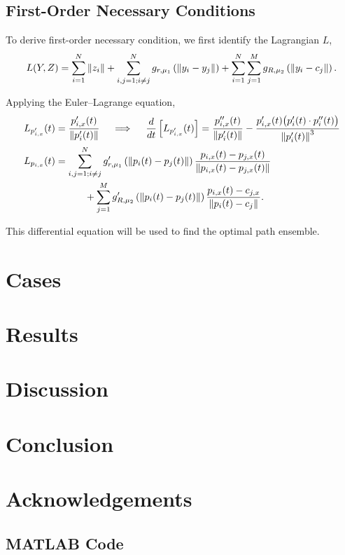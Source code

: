 \documentclass[11pt]{article}
\begin{document}
\subsection{First-Order Necessary Conditions}

To derive first-order necessary condition, we first identify the Lagrangian \(L\),
\begin{equation}
	L(Y,Z) = \sum_{i=1}^{N} \left\lVert z_i \right\rVert + \sum_{i,j = 1; i \neq j}^{N} g_{r,\mu_1}\left( \left\lVert y_i - y_j \right\rVert \right) + \sum_{i=1}^{N} \sum_{j=1}^{M} g_{R,\mu_2}\left( \left\lVert y_i - c_j \right\rVert \right).
\end{equation}

Applying the Euler--Lagrange equation,
\begin{align}
	&L_{p'_{i,x}}(t) = \frac{p'_{i,x}(t)}{\left\lVert p'_i(t) \right\rVert}
	\quad\implies\quad
	\frac{d}{dt}\left[ L_{p'_{i,x}}(t) \right] = \frac{p''_{i,x}(t)}{\left\lVert p'_i(t) \right\rVert} - \frac{p'_{i,x}(t) \big( p'_i(t) \cdot p''_i(t) \big)}{\left\lVert p'_i(t) \right\rVert^3} \\
	&\begin{aligned}
	L_{p_{i,x}}(t) &= \sum_{i,j=1; i \neq j}^{N} g'_{r,\mu_1}\left( \left\lVert p_i(t) - p_j(t) \right\rVert \right) \frac{p_{i,x}(t) - p_{j,x}(t)}{\left\lVert p_{i,x}(t) - p_{j,x}(t) \right\rVert} \\
	&\qquad\quad+ \sum_{j=1}^{M} g'_{R,\mu_2}\left( \left\lVert p_i(t) - p_j(t) \right\rVert \right) \frac{p_{i,x}(t) - c_{j,x}}{\left\lVert p_i(t) - c_j \right\rVert}.
	\end{aligned}
\end{align}

This differential equation will be used to find the optimal path ensemble.

\section{Cases}

\section{Results}

\section{Discussion}

\section{Conclusion}

\section{Acknowledgements}




\begin{appendices}

\section{MATLAB Code}

\end{appendices}
\end{document}
